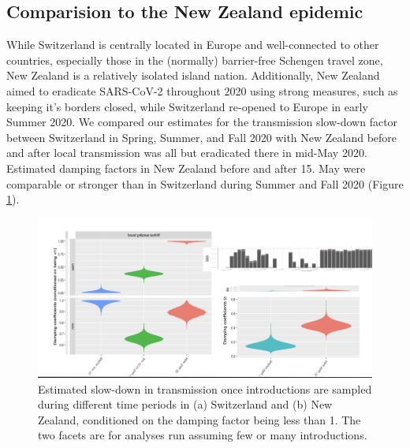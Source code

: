 \documentclass[9pt,twoside,lineno]{pnas-new} %
\begin{document}
\subsection{Comparision to the New Zealand epidemic}
While Switzerland is centrally located in Europe and well-connected to other countries, especially those in the (normally) barrier-free Schengen travel zone, New Zealand is a relatively isolated island nation. Additionally, New Zealand aimed to eradicate SARS-CoV-2 throughout 2020 using strong measures, such as keeping it's borders closed, while Switzerland re-opened to Europe in early Summer 2020. We compared our estimates for the transmission slow-down factor between Switzerland in Spring, Summer, and Fall 2020 with New Zealand before and after local transmission was all but eradicated there in mid-May 2020. Estimated damping factors in New Zealand before and after 15. May were comparable or stronger than in Switzerland during Summer and Fall 2020 (Figure \ref{fig:scale-factor}).

\begin{figure}[tbhp]
\centering
\includegraphics[width=\linewidth]{figures/bdsky_2021-08-18/scale_factor_comparison.png}
\caption{Estimated slow-down in transmission once introductions are sampled during different time periods in (a) Switzerland and (b) New Zealand, conditioned on the damping factor being less than 1. The two facets are for analyses run assuming few or many introductions.}  
\label{fig:scale-factor}
\end{figure}
\end{document}
